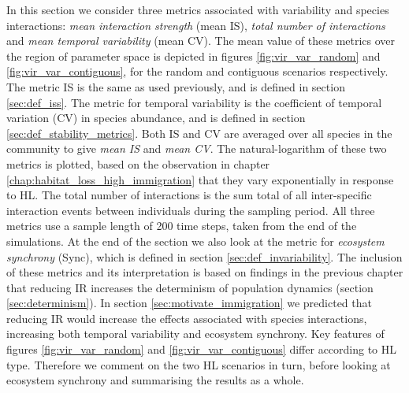 In this section we consider three metrics associated with variability and species interactions: \emph{mean interaction strength} (mean IS), \emph{total number of interactions} and \emph{mean temporal variability} (mean CV). The mean value of these metrics over the region of parameter space is depicted in figures \ref{fig:vir_var_random} and \ref{fig:vir_var_contiguous}, for the random and contiguous scenarios respectively. The metric IS is the same as used previously, and is defined in section \ref{sec:def_iss}. The metric for temporal variability is the coefficient of temporal variation (CV) in species abundance, and is defined in section \ref{sec:def_stability_metrics}. Both IS and CV are averaged over all species in the community to give \emph{mean IS} and \emph{mean CV}. The natural-logarithm of these two metrics is plotted, based on the observation in chapter \ref{chap:habitat_loss_high_immigration} that they vary exponentially in response to HL. The total number of interactions is the sum total of all inter-specific interaction events between individuals during the sampling period. All three metrics use a sample length of 200 time steps, taken from the end of the simulations. At the end of the section we also look at the metric for \emph{ecosystem synchrony} (Sync), which is defined in section \ref{sec:def_invariability}. The inclusion of these metrics and its interpretation  is based on findings in the previous chapter that reducing IR increases the determinism of population dynamics (section \ref{sec:determinism}). In section \ref{sec:motivate_immigration} we predicted that reducing IR would increase the effects associated with species interactions, increasing both temporal variability and ecosystem synchrony. Key features of figures \ref{fig:vir_var_random} and \ref{fig:vir_var_contiguous} differ according to HL type. Therefore we comment on the two HL scenarios in turn, before looking at ecosystem synchrony and summarising the results as a whole.

